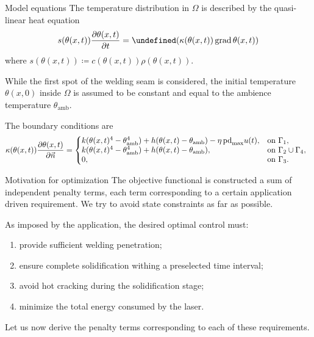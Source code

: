 \documentclass[
	9pt,
	hyperref = {unicode,pdfpagelabels=false},
	notheorems,
	aspectratio=169
	]{beamer}
\let\div\undefined
\DeclareMathOperator{\div}{div}
\DeclareMathOperator{\grad}{grad}
\begin{document}
\begin{frame}{Model equations}
The temperature distribution in $\Omega$ is described by the quasi-linear heat equation
\begin{equation} \label{eq:heat_eq}
	s(\theta(x,t)) \frac{\partial \theta(x,t)}{\partial t} = \div (\kappa(\theta(x,t)) \grad\theta(x,t))
\end{equation}
where $s(\theta(x,t)) \coloneqq c(\theta(x,t)) \rho(\theta(x,t))$.

While the first spot of the welding seam is considered, the initial temperature $\theta(x,0)$ inside $\Omega$ is assumed to be constant and equal to the ambience temperature $\theta_\text{amb}$.

The boundary conditions are
{\small
\begin{equation}
	\kappa(\theta(x,t)) \frac{\partial \theta(x,t)}{\partial \vec{n}} = \left\{
		\hspace{-0.5em}
		\begin{array}{ll}
			k (\theta(x,t)^4 - \theta_\text{amb}^4) + h (\theta(x,t) - \theta_\text{amb}) - \eta\, \text{pd}_{\max} u(t), & \text{on}\ \Gamma_1, \\
			k (\theta(x,t)^4 - \theta_\text{amb}^4) + h (\theta(x,t) - \theta_\text{amb}), & \text{on}\ \Gamma_2 \cup \Gamma_4, \\
			0, & \text{on}\ \Gamma_3.%
		\end{array} \right.
\end{equation}
}
\end{frame}


\begin{frame}{Motivation for optimization} 
The objective functional is constructed a sum of independent penalty terms, each term corresponding to a certain application driven requirement.
We try to avoid state constraints as far as possible.

\begin{block}{As imposed by the application, the desired optimal control must:}
	\begin{enumerate}[label=(\arabic*)]
		\item provide sufficient welding penetration;
		\item ensure complete solidification withing a preselected time interval;
		\item avoid hot cracking during the solidification stage;
		\item minimize the total energy consumed by the laser.
	\end{enumerate}
\end{block}

Let us now derive the penalty terms corresponding to each of these requirements.
\end{frame}
\end{document}
